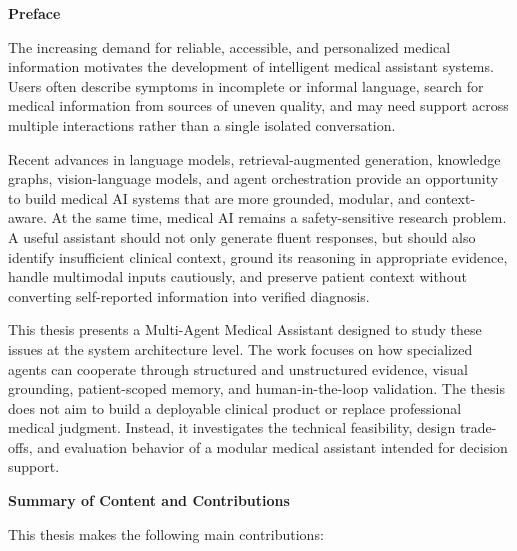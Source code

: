 \newpage
\thispagestyle{empty}
\begin{center}
    \Large\bfseries Preface
\end{center}
\vspace{0.1cm}

The increasing demand for reliable, accessible, and personalized medical information motivates the development of intelligent medical assistant systems. Users often describe symptoms in incomplete or informal language, search for medical information from sources of uneven quality, and may need support across multiple interactions rather than a single isolated conversation.

Recent advances in language models, retrieval-augmented generation, knowledge graphs, vision-language models, and agent orchestration provide an opportunity to build medical AI systems that are more grounded, modular, and context-aware. At the same time, medical AI remains a safety-sensitive research problem. A useful assistant should not only generate fluent responses, but should also identify insufficient clinical context, ground its reasoning in appropriate evidence, handle multimodal inputs cautiously, and preserve patient context without converting self-reported information into verified diagnosis.

This thesis presents a Multi-Agent Medical Assistant designed to study these issues at the system architecture level. The work focuses on how specialized agents can cooperate through structured and unstructured evidence, visual grounding, patient-scoped memory, and human-in-the-loop validation. The thesis does not aim to build a deployable clinical product or replace professional medical judgment. Instead, it investigates the technical feasibility, design trade-offs, and evaluation behavior of a modular medical assistant intended for decision support.

\begin{center}
    \Large\bfseries Summary of Content and Contributions
\end{center}
\vspace{0.1cm}

This thesis makes the following main contributions:

